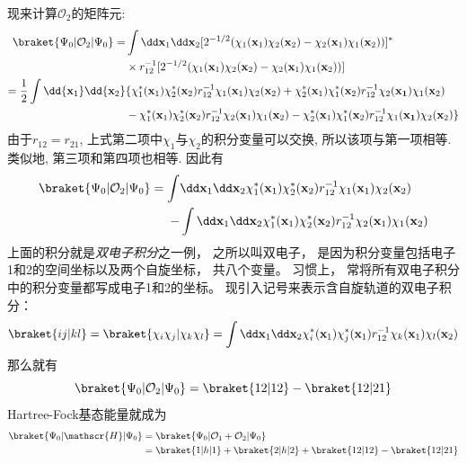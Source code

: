 
现来计算$\mathcal{O}_2$的矩阵元:
\begin{align}
\braket{\Psi_0|\mathcal{O}_2|\Psi_0}=&\int\dd\mathbf{x}_1\dd\mathbf{x}_2[2^{-1/2}(\chi_1(\mathbf{x}_1)\chi_2(\mathbf{x}_2)-\chi_2(\mathbf{x}_1)\chi_1(\mathbf{x}_2))]^*\notag\\
\qquad&\times r_{12}^{-1} [2^{-1/2}(\chi_1(\mathbf{x}_1)\chi_2(\mathbf{x}_2)-\chi_2(\mathbf{x}_1)\chi_1(\mathbf{x}_2))]\notag\\
=\frac{1}{2}\int\dd{\mathbf{x}_1}\dd{\mathbf{x}_2}&\{\chi_1^*(\mathbf{x}_1)\chi_2^*(\mathbf{x}_2)r_{12}^{-1}\chi_1(\mathbf{x}_1)\chi_2(\mathbf{x}_2) + \chi_2^*(\mathbf{x}_1)\chi_1^*(\mathbf{x}_2)r_{12}^{-1}\chi_2(\mathbf{x_1})\chi_1(\mathbf{x}_2) \notag\\
\qquad& - \chi_1^*(\mathbf{x}_1)\chi_2^*(\mathbf{x}_2)r_{12}^{-1}\chi_2(\mathbf{x}_1)\chi_1(\mathbf{x}_2) - \chi_2^*(\mathbf{x}_1)\chi_1^*(\mathbf{x}_2)r_{12}^{-1}\chi_1(\mathbf{x_1})\chi_2(\mathbf{x}_2)
\}
\end{align}
由于$r_{12}=r_{21}$, 
上式第二项中$\chi_1$与$\chi_2$的积分变量可以交换, 
所以该项与第一项相等. 
类似地, 
第三项和第四项也相等. 
因此有
\begin{align}
\braket{\Psi_0|\mathcal{O}_2|\Psi_0}=\int&\dd\mathbf{x}_1\dd\mathbf{x}_2 \chi_1^*(\mathbf{x}_1)\chi_2^*(\mathbf{x}_2)r_{12}^{-1}\chi_1(\mathbf{x}_1)\chi_2(\mathbf{x}_2)\notag\\
 -& \int\dd\mathbf{x}_1\dd\mathbf{x}_2\chi_1^*(\mathbf{x}_1)\chi_2^*(\mathbf{x}_2)r_{12}^{-1}\chi_2(\mathbf{x}_1)\chi_1(\mathbf{x}_2)
\end{align}
上面的积分就是\emph{双电子积分}之一例，
之所以叫双电子，
是因为积分变量包括电子1和2的空间坐标以及两个自旋坐标，
共八个变量。
习惯上，
常将所有双电子积分中的积分变量都写成电子1和2的坐标。
现引入记号来表示含自旋轨道的双电子积分：
\begin{equation}
\braket{ij|kl}=\braket{\chi_i\chi_j|\chi_k\chi_l}=\int\dd\mathbf{x}_1\dd\mathbf{x}_2\chi_i^*(\mathbf{x}_1)\chi_j^*(\mathbf{x}_1)r_{12}^{-1}\chi_k(\mathbf{x}_1)\chi_l(\mathbf{x}_2)
\label{2.90}
\end{equation}
那么就有
\begin{equation}
\braket{\Psi_0|\mathcal{O}_2|\Psi_0}=\braket{12|12}-\braket{12|21}
\end{equation}
Hartree-Fock基态能量就成为
\begin{align}
\label{2.92}
\braket{\Psi_0|\mathscr{H}|\Psi_0}&=\braket{\Psi_0|\mathcal{O}_1+\mathcal{O}_2|\Psi_0}\notag\\
&=\braket{1|h|1}+\braket{2|h|2}+\braket{12|12}-\braket{12|21}
\end{align}


